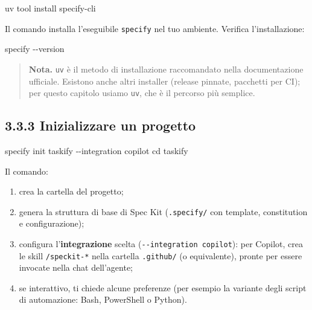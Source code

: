 \documentclass[
  italian,
  10pt,
]{book}
\newenvironment{Shaded}{\begin{snugshade}}{\end{snugshade}}
\newcommand{\AttributeTok}[1]{\textcolor[rgb]{0.13,0.29,0.53}{#1}}
\newcommand{\BuiltInTok}[1]{#1}
\newcommand{\ExtensionTok}[1]{#1}
\newcommand{\NormalTok}[1]{#1}
\providecommand{\tightlist}{%
  \setlength{\itemsep}{0pt}\setlength{\parskip}{0pt}}
\begin{document}
\begin{Shaded}
\begin{Highlighting}[]
\ExtensionTok{uv}\NormalTok{ tool install specify{-}cli}
\end{Highlighting}
\end{Shaded}

Il comando installa l'eseguibile \texttt{specify} nel tuo ambiente.
Verifica l'installazione:

\begin{Shaded}
\begin{Highlighting}[]
\ExtensionTok{specify} \AttributeTok{{-}{-}version}
\end{Highlighting}
\end{Shaded}

\begin{quote}
\textbf{Nota.} \texttt{uv} è il metodo di installazione raccomandato
nella documentazione ufficiale. Esistono anche altri installer (release
pinnate, pacchetti per CI); per questo capitolo usiamo \texttt{uv}, che
è il percorso più semplice.
\end{quote}

\subsection{3.3.3 Inizializzare un
progetto}\label{inizializzare-un-progetto}

\begin{Shaded}
\begin{Highlighting}[]
\ExtensionTok{specify}\NormalTok{ init taskify }\AttributeTok{{-}{-}integration}\NormalTok{ copilot}
\BuiltInTok{cd}\NormalTok{ taskify}
\end{Highlighting}
\end{Shaded}

Il comando:

\begin{enumerate}
\def\labelenumi{\arabic{enumi}.}
\tightlist
\item
  crea la cartella del progetto;
\item
  genera la struttura di base di Spec Kit (\texttt{.specify/} con
  template, constitution e configurazione);
\item
  configura l'\textbf{integrazione} scelta
  (\texttt{-\/-integration\ copilot}): per Copilot, crea le skill
  \texttt{/speckit-*} nella cartella \texttt{.github/} (o equivalente),
  pronte per essere invocate nella chat dell'agente;
\item
  se interattivo, ti chiede alcune preferenze (per esempio la variante
  degli script di automazione: Bash, PowerShell o Python).
\end{enumerate}
\end{document}
